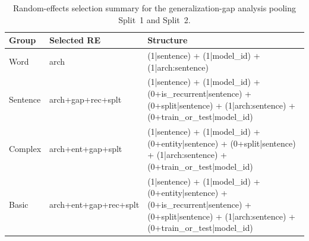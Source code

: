\begin{table}[t]
\centering\scriptsize
\begin{tabular}{@{}lll@{}}
\toprule
\textbf{Group} & \textbf{Selected RE} & \textbf{Structure} \\
\midrule
Word & arch & (1|sentence) + (1|model\_id) + (1|arch:sentence) \\
Sentence & arch+gap+rec+splt & (1|sentence) + (1|model\_id) + (0+is\_recurrent|sentence) + (0+split|sentence) + (1|arch:sentence) + (0+train\_or\_test|model\_id) \\
Complex & arch+ent+gap+splt & (1|sentence) + (1|model\_id) + (0+entity|sentence) + (0+split|sentence) + (1|arch:sentence) + (0+train\_or\_test|model\_id) \\
Basic & arch+ent+gap+rec+splt & (1|sentence) + (1|model\_id) + (0+entity|sentence) + (0+is\_recurrent|sentence) + (0+split|sentence) + (1|arch:sentence) + (0+train\_or\_test|model\_id) \\
\bottomrule
\end{tabular}
\caption{\small Random-effects selection summary for the generalization-gap analysis pooling Split~1 and Split~2.}
\label{tab:gap_re_selection}
\end{table}
